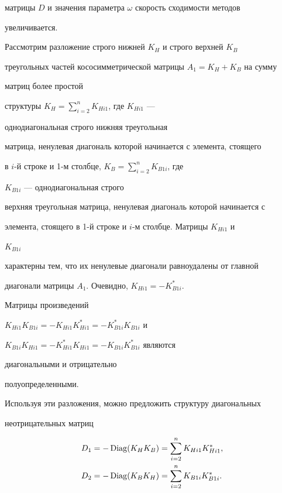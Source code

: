 матрицы $D$ и значения параметра $\omega$ скорость сходимости методов 


увеличивается. 


 


Рассмотрим разложение строго нижней $K_H$ и строго верхней $K_B$ 


треугольных частей кососимметрической матрицы $A_1=K_H+K_B$ на сумму 


матриц более простой 


структуры $K_H=\sum\limits^n_{i=2}K_{Hi1}$, где $K_{Hi1}$ --- 


однодиагональная строго нижняя треугольная 


матрица, ненулевая диагональ которой начинается с элемента, стоящего 


в $i$-й строке и 1-м столбце, $K_B=\sum\limits^n_{i=2}K_{B1i}$, где 


$K_{B1i}$ --- однодиагональная строго 


верхняя треугольная матрица, ненулевая диагональ которой начинается с 


элемента, стоящего в 1-й строке и $i$-м столбце. Матрицы $K_{Hi1}$ и 


$K_{B1i}$ 


характерны тем, что их ненулевые диагонали равноудалены от главной 


диагонали матрицы $A_1$. Очевидно, $K_{Hi1}=-K^*_{B1i}$. 


 


Матрицы произведений 


$K_{Hi1}K_{B1i}=-K_{Hi1}K^*_{Hi1}=-K^*_{B1i}K_{B1i}$ и 


$K_{B1i}K_{Hi1}=-K^*_{Hi1}K_{Hi1}=-K_{B1i}K^*_{B1i}$ являются 


диагональными и отрицательно 


полуопределенными. 


 


Используя эти разложения, можно предложить структуру диагональных 


неотрицательных матриц 


\begin{align*} 


D_1&=-\Diag(K_H K_B)=\sum^n_{i=2}K_{Hi1}K^*_{Hi1},\\ 


D_2&=-\Diag(K_B K_H)=\sum^n_{i=2}K_{B1i}K^*_{B1i}. 


\end{align*} 


